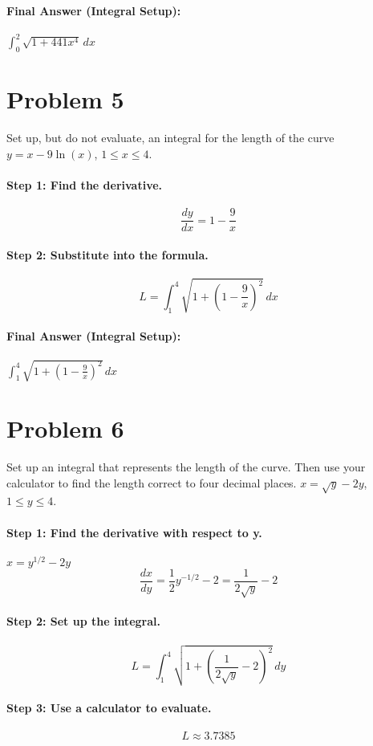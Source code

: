 \documentclass{article}
\begin{document}
\paragraph{Final Answer (Integral Setup):} $\int_{0}^{2} \sqrt{1 + 441x^4} \,dx$

\section*{Problem 5}
Set up, but do not evaluate, an integral for the length of the curve $y = x - 9 \ln(x)$, $1 \le x \le 4$.

\paragraph{Step 1: Find the derivative.}
\[ \frac{dy}{dx} = 1 - \frac{9}{x} \]

\paragraph{Step 2: Substitute into the formula.}
\[ L = \int_{1}^{4} \sqrt{1 + (1 - \frac{9}{x})^2} \,dx \]

\paragraph{Final Answer (Integral Setup):} $\int_{1}^{4} \sqrt{1 + (1 - \frac{9}{x})^2} \,dx$

\section*{Problem 6}
Set up an integral that represents the length of the curve. Then use your calculator to find the length correct to four decimal places. $x = \sqrt{y} - 2y$, $1 \le y \le 4$.

\paragraph{Step 1: Find the derivative with respect to y.}
$x = y^{1/2} - 2y$
\[ \frac{dx}{dy} = \frac{1}{2}y^{-1/2} - 2 = \frac{1}{2\sqrt{y}} - 2 \]

\paragraph{Step 2: Set up the integral.}
\[ L = \int_{1}^{4} \sqrt{1 + (\frac{1}{2\sqrt{y}} - 2)^2} \,dy \]

\paragraph{Step 3: Use a calculator to evaluate.}
\[ L \approx 3.7385 \]
\end{document}
